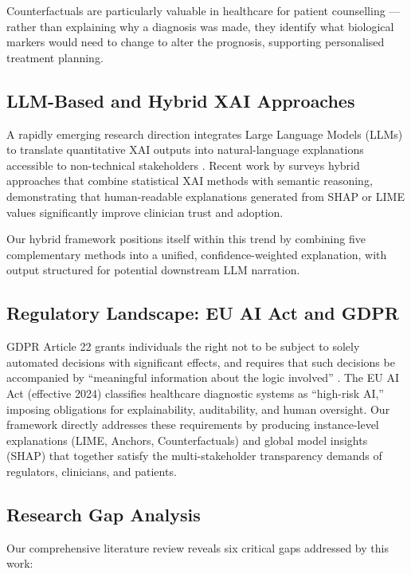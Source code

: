 \documentclass[journal]{IEEEtran}
\newcommand{\citep}[1]{\cite{#1}}
\newcommand{\citet}[1]{\cite{#1}}
\begin{document}
Counterfactuals are particularly valuable in healthcare for patient counselling — rather than explaining why a diagnosis was made, they identify what biological markers would need to change to alter the prognosis, supporting personalised treatment planning.

\subsection{LLM-Based and Hybrid XAI Approaches}

A rapidly emerging research direction integrates Large Language Models (LLMs) to translate quantitative XAI outputs into natural-language explanations accessible to non-technical stakeholders \citep{arrieta2020explainable}. Recent work by \citet{adadi2018peeking} surveys hybrid approaches that combine statistical XAI methods with semantic reasoning, demonstrating that human-readable explanations generated from SHAP or LIME values significantly improve clinician trust and adoption.

Our hybrid framework positions itself within this trend by combining five complementary methods into a unified, confidence-weighted explanation, with output structured for potential downstream LLM narration.

\subsection{Regulatory Landscape: EU AI Act and GDPR}

GDPR Article 22 grants individuals the right not to be subject to solely automated decisions with significant effects, and requires that such decisions be accompanied by ``meaningful information about the logic involved'' \citep{goodman2017european}. The EU AI Act (effective 2024) classifies healthcare diagnostic systems as ``high-risk AI,'' imposing obligations for explainability, auditability, and human oversight. Our framework directly addresses these requirements by producing instance-level explanations (LIME, Anchors, Counterfactuals) and global model insights (SHAP) that together satisfy the multi-stakeholder transparency demands of regulators, clinicians, and patients.

\subsection{Research Gap Analysis}

Our comprehensive literature review reveals six critical gaps addressed by this work:
\end{document}
